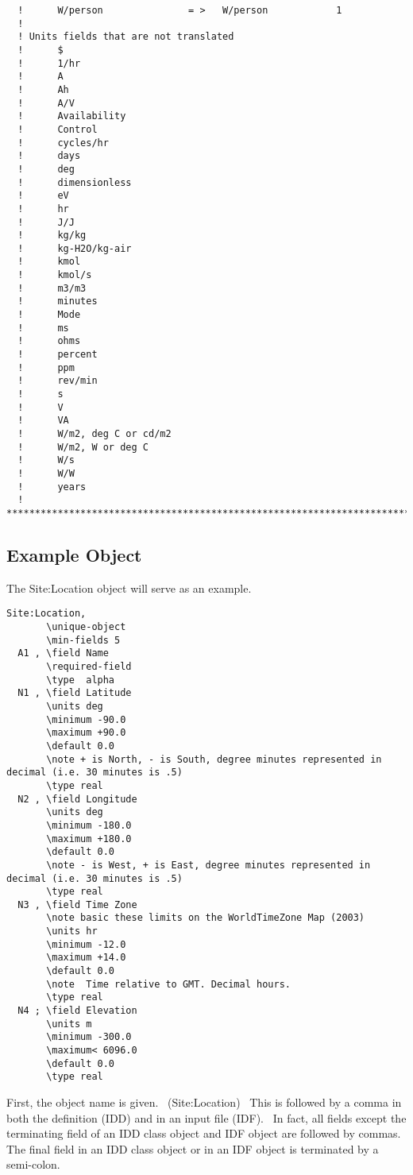 \begin{lstlisting}
  !      W/person               = >   W/person            1
  !
  ! Units fields that are not translated
  !      $
  !      1/hr
  !      A
  !      Ah
  !      A/V
  !      Availability
  !      Control
  !      cycles/hr
  !      days
  !      deg
  !      dimensionless
  !      eV
  !      hr
  !      J/J
  !      kg/kg
  !      kg-H2O/kg-air
  !      kmol
  !      kmol/s
  !      m3/m3
  !      minutes
  !      Mode
  !      ms
  !      ohms
  !      percent
  !      ppm
  !      rev/min
  !      s
  !      V
  !      VA
  !      W/m2, deg C or cd/m2
  !      W/m2, W or deg C
  !      W/s
  !      W/W
  !      years
  ! **************************************************************************
\end{lstlisting}

\subsection{Example Object}\label{example-object}

The Site:Location object will serve as an example.

\begin{lstlisting}
Site:Location,
       \unique-object
       \min-fields 5
  A1 , \field Name
       \required-field
       \type  alpha
  N1 , \field Latitude
       \units deg
       \minimum -90.0
       \maximum +90.0
       \default 0.0
       \note + is North, - is South, degree minutes represented in decimal (i.e. 30 minutes is .5)
       \type real
  N2 , \field Longitude
       \units deg
       \minimum -180.0
       \maximum +180.0
       \default 0.0
       \note - is West, + is East, degree minutes represented in decimal (i.e. 30 minutes is .5)
       \type real
  N3 , \field Time Zone
       \note basic these limits on the WorldTimeZone Map (2003)
       \units hr
       \minimum -12.0
       \maximum +14.0
       \default 0.0
       \note  Time relative to GMT. Decimal hours.
       \type real
  N4 ; \field Elevation
       \units m
       \minimum -300.0
       \maximum< 6096.0
       \default 0.0
       \type real
\end{lstlisting}

First, the object name is given.~ (Site:Location)~ This is followed by a comma in both the definition (IDD) and in an input file (IDF).~ In fact, all fields except the terminating field of an IDD class object and IDF object are followed by commas.~ The final field in an IDD class object or in an IDF object is terminated by a semi-colon.

